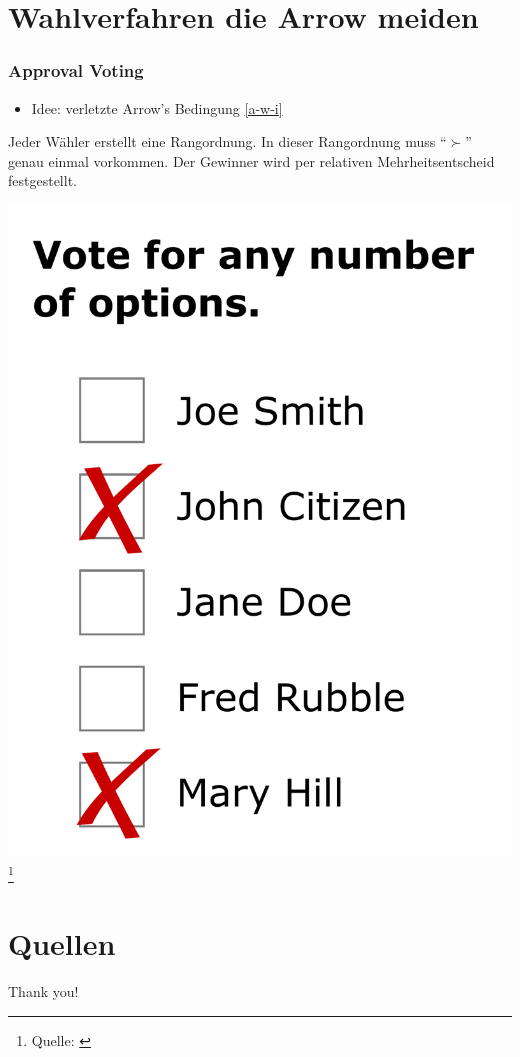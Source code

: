 \documentclass{beamer}
\begin{document}
\section{Wahlverfahren die Arrow meiden}
\begin{frame}[fragile]
	\frametitle{Approval Voting}
	\begin{itemize}
		\item Idee: verletzte  Arrow's Bedingung \ref{a-w-i}
	\end{itemize}
	\begin{definition}
	Jeder Wähler erstellt eine Rangordnung. In dieser Rangordnung muss ``$\succ$'' genau einmal vorkommen. Der Gewinner wird per relativen Mehrheitsentscheid festgestellt.
	\end{definition}
\end{frame}

\begin{frame}[fragile]
	\begin{center}
		\includegraphics[width=0.5\linewidth]{approval-ballot.pdf}\footnote{Quelle: \cite{apprwiki}}
	\end{center}
\end{frame}


\section{Quellen}
\begin{frame}
	\begin{tiny}
	
	\end{tiny}
\end{frame}


\begin{frame}
	\begin{center}
		Thank you!
	\end{center}
\end{frame}
\end{document}
